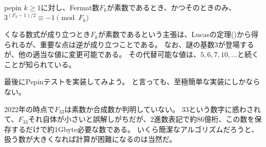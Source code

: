 \begin{Theo}{}{pepin}
$k\ge1$に対し、Fermat数$F_k$が素数であるとき、かつそのときのみ、$3^{(F_k - 1)/2}\equiv-1\pmod{F_k}$
\end{Theo}

くなる数式が成り立つとき$F_k$が素数であるという主張は、Lucasの定理()から得られるが、重要な点は逆が成り立つことである。
なお、謎の基数3が登場するが、他の適当な値に変更可能である。
その代替可能な値は、$5,6,7,10,\ldots$と続くことが知られている。

最後にPepinテストを実装してみよう。
と言っても、至極簡単な実装にしかならない。


2022年の時点で$F_{33}$は素数か合成数か判明していない。
33という数字に惑わされて、$F_{33}$それ自体が小さいと誤解しがちだが、2進数表記で約86億桁、この数を保存するだけで約1Gbyte必要な数である。
いくら簡潔なアルゴリズムだろうと、扱う数が大きくなれば計算が困難になるのは当然だ。
